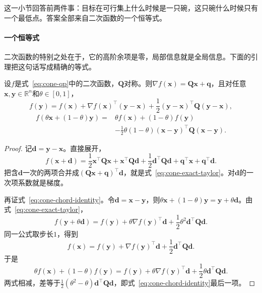 这一小节回答前两件事：目标在可行集上什么时候是一只碗，这只碗什么时候只有一个最低点。答案全部来自二次函数的一个恒等式。

\paragraph{一个恒等式}
二次函数的特别之处在于，它的高阶余项是零，局部信息就是全局信息。下面的引理把这句话写成精确的等式。

\begin{lemma}[二次函数的两个恒等式]
\label{lem:cone-quadratic-identities}
设$f$是式~\eqref{eq:cone-qp}中的二次函数，$\bm{Q}$对称。则$\nabla f(\bm{x})=\bm{Q}\bm{x}+\bm{q}$，且对任意$\bm{x},\bm{y}\in\mathbb{R}^n$和$\theta\in[0,1]$，
\begin{equation}
 f(\bm{y})=f(\bm{x})+\nabla f(\bm{x})^\top(\bm{y}-\bm{x})+\frac12(\bm{y}-\bm{x})^\top\bm{Q}(\bm{y}-\bm{x}),
 \label{eq:cone-exact-taylor}
\end{equation}
\begin{equation}
 \begin{aligned}
 f(\theta\bm{x}+(1-\theta)\bm{y})={}&\theta f(\bm{x})+(1-\theta)f(\bm{y})\\
 &-\frac12\theta(1-\theta)(\bm{x}-\bm{y})^\top\bm{Q}(\bm{x}-\bm{y}).
 \end{aligned}
 \label{eq:cone-chord-identity}
\end{equation}
\end{lemma}

\begin{proof}
记$\bm{d}=\bm{y}-\bm{x}$。直接展开，
\[
 f(\bm{x}+\bm{d})=\frac12\bm{x}^\top\bm{Q}\bm{x}+\bm{x}^\top\bm{Q}\bm{d}+\frac12\bm{d}^\top\bm{Q}\bm{d}+\bm{q}^\top\bm{x}+\bm{q}^\top\bm{d}.
\]
把含$\bm{d}$一次的两项合并成$(\bm{Q}\bm{x}+\bm{q})^\top\bm{d}$，就是式~\eqref{eq:cone-exact-taylor}。对$\bm{d}$的一次项系数就是梯度。

再证式~\eqref{eq:cone-chord-identity}。令$\bm{d}=\bm{x}-\bm{y}$，则$\theta\bm{x}+(1-\theta)\bm{y}=\bm{y}+\theta\bm{d}$。由式~\eqref{eq:cone-exact-taylor}，
\[
 f(\bm{y}+\theta\bm{d})=f(\bm{y})+\theta\nabla f(\bm{y})^\top\bm{d}+\frac12\theta^2\bm{d}^\top\bm{Q}\bm{d}.
\]
同一公式取步长$1$，得到
\[
 f(\bm{x})=f(\bm{y})+\nabla f(\bm{y})^\top\bm{d}+\frac12\bm{d}^\top\bm{Q}\bm{d}.
\]
于是
\[
 \theta f(\bm{x})+(1-\theta)f(\bm{y})=f(\bm{y})+\theta\nabla f(\bm{y})^\top\bm{d}+\frac12\theta\bm{d}^\top\bm{Q}\bm{d}.
\]
两式相减，差等于$\frac12(\theta^2-\theta)\bm{d}^\top\bm{Q}\bm{d}$，即式~\eqref{eq:cone-chord-identity}最后一项。
\end{proof}

